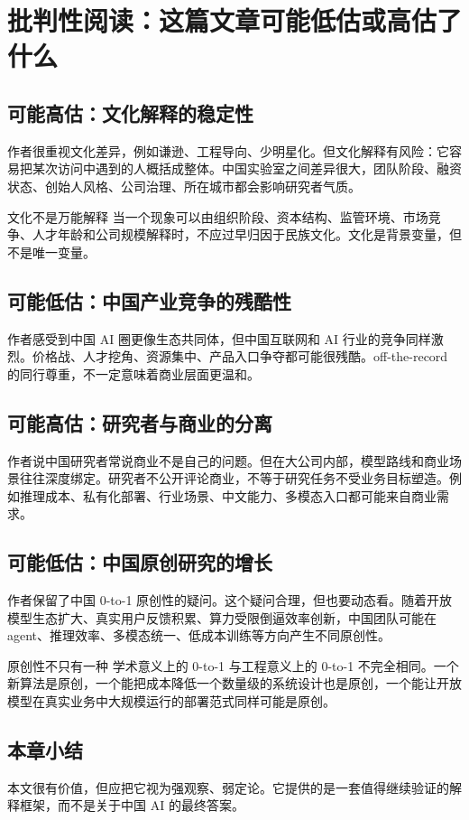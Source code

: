 \section{批判性阅读：这篇文章可能低估或高估了什么}

\subsection{可能高估：文化解释的稳定性}

作者很重视文化差异，例如谦逊、工程导向、少明星化。但文化解释有风险：它容易把某次访问中遇到的人概括成整体。中国实验室之间差异很大，团队阶段、融资状态、创始人风格、公司治理、所在城市都会影响研究者气质。

\begin{warningbox}{文化不是万能解释}
当一个现象可以由组织阶段、资本结构、监管环境、市场竞争、人才年龄和公司规模解释时，不应过早归因于民族文化。文化是背景变量，但不是唯一变量。
\end{warningbox}

\subsection{可能低估：中国产业竞争的残酷性}

作者感受到中国 AI 圈更像生态共同体，但中国互联网和 AI 行业的竞争同样激烈。价格战、人才挖角、资源集中、产品入口争夺都可能很残酷。off-the-record 的同行尊重，不一定意味着商业层面更温和。

\subsection{可能高估：研究者与商业的分离}

作者说中国研究者常说商业不是自己的问题。但在大公司内部，模型路线和商业场景往往深度绑定。研究者不公开评论商业，不等于研究任务不受业务目标塑造。例如推理成本、私有化部署、行业场景、中文能力、多模态入口都可能来自商业需求。

\subsection{可能低估：中国原创研究的增长}

作者保留了中国 0-to-1 原创性的疑问。这个疑问合理，但也要动态看。随着开放模型生态扩大、真实用户反馈积累、算力受限倒逼效率创新，中国团队可能在 agent、推理效率、多模态统一、低成本训练等方向产生不同原创性。

\begin{knowledgebox}{原创性不只有一种}
学术意义上的 0-to-1 与工程意义上的 0-to-1 不完全相同。一个新算法是原创，一个能把成本降低一个数量级的系统设计也是原创，一个能让开放模型在真实业务中大规模运行的部署范式同样可能是原创。
\end{knowledgebox}

\subsection{本章小结}

本文很有价值，但应把它视为强观察、弱定论。它提供的是一套值得继续验证的解释框架，而不是关于中国 AI 的最终答案。


